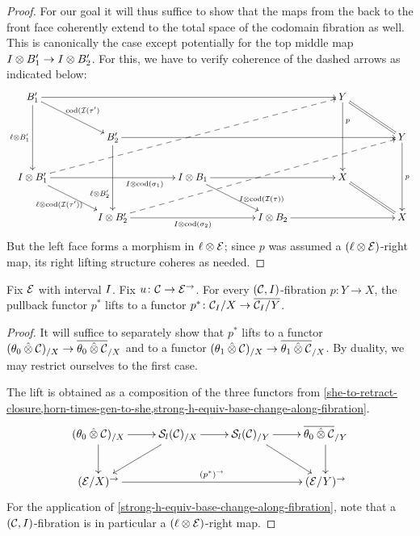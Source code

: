 \documentclass[reqno,10pt,a4paper,oneside]{amsart}
\begin{document}
\begin{proof}
For our goal it will thus suffice to show that the maps from the back to the front face coherently extend to the total space of the codomain fibration as well.
This is canonically the case except potentially for the top middle map $\interval \otimes B_1' \to \interval \otimes B_2'$.
For this, we have to verify coherence of the dashed arrows as indicated below:
\[
\xymatrix@C+2em{
  B_1'
  \ar[rrrr]
  \ar[dd]_{\intervall \otimes B_1'}
  \ar[dr]^{\cod(\cal{I}(\tau')}
&&&&
  Y
  \ar[dd]^(0.3){p}
  \ar@{=}[dr]
\\&
  B_2'
  \ar[rrrr]
  \ar[dd]_(0.7){\intervall \otimes B_2'}
&&&&
  Y
  \ar[dd]^{p}
\\
  \interval \otimes B_1'
  \ar[rr]_(0.7){I \otimes \cod(\sigma_1)}
  \ar@{-->}[uurrrr]
  \ar[dr]_{\intervall \otimes \cod(\cal{I}(\tau'))}
&&
  \interval \otimes B_1
  \ar[rr]
  \ar[dr]^(0.7){\interval \otimes \cod(\cal{I}(\tau))}
&&
  X
  \ar@{=}[dr]
\\&
  \interval \otimes B_2'
  \ar[rr]_{I \otimes \cod(\sigma_2)}
  \ar@{-->}[uurrrr]
&&
  \interval \otimes B_2
  \ar[rr]
&&
  X
}
\]
But the left face forms a morphism in $\intervall \otimes \catE$; since $p$ was assumed a $(\intervall \otimes \catE)$-right map, its right lifting structure coheres as needed.
\end{proof}

\begin{theorem}
Fix $\cal{E}$ with interval $\interval$.
Fix $u \co \cal{C} \to \cal{E}^\to$.
For every $(\cal{C}, I)$-fibration $p : Y \to X$, the pullback functor $p^*$ lifts to a functor $p^* \co \cal{C}_I/X \to \overline{\cal{C}_I/Y}$.
\end{theorem}

\begin{proof}
It will suffice to separately show that $p^*$ lifts to a functor $(\thetal \hatotimes \cal{C})_{/X} \to \overline{\thetal \hatotimes \cal{C}}_{/X}$ and to a functor $(\thetar \hatotimes \cal{C})_{/X} \to \overline{\thetar \hatotimes \cal{C}}_{/X}$.
By duality, we may restrict ourselves to the first case.

The lift is obtained as a composition of the three functors from \cref{she-to-retract-closure,horn-times-gen-to-she,strong-h-equiv-base-change-along-fibration}.
\[
\xymatrix{
  (\thetal \hatotimes \cal{C})_{/X}
  \ar[r]
  \ar[d]
&
  \cal{S}_l(\cal{C})_{/X}
  \ar[r]
  \ar[dl]
&
  \cal{S}_l(\cal{C})_{/Y}
  \ar[r]
  \ar[dr]
&
  \overline{\thetal \hatotimes \cal{C}}_{/Y}
  \ar[d]
\\
  (\catE/X)^{\to}
  \ar[rrr]^{(p^*)^{\to}}
&&&
  (\catE/Y)^{\to}
}
\]
For the application of \cref{strong-h-equiv-base-change-along-fibration}, note that a $(\cal{C}, \interval)$-fibration is in particular a $(\intervall \otimes \calE)$-right map.
\end{proof}
\end{document}

